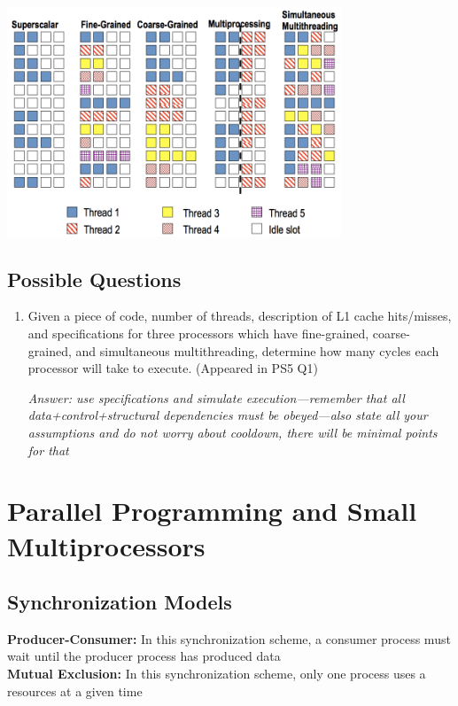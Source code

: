 \documentclass{article}
\begin{document}
\begin{center}
\includegraphics[width=0.75\textwidth]{multithreading}
\end{center}

\subsection{Possible Questions}

\begin{enumerate}
\item Given a piece of code, number of threads, description of L1 cache hits/misses, and specifications for three processors which have fine-grained, coarse-grained, and simultaneous multithreading, determine how many cycles each processor will take to execute. (Appeared in PS5 Q1)

\textit{Answer: use specifications and simulate execution---remember that all data+control+structural dependencies must be obeyed---also state all your assumptions and do not worry about cooldown, there will be minimal points for that}

\end{enumerate}

\section{Parallel Programming and Small Multiprocessors}

\subsection{Synchronization Models}

\textbf{Producer-Consumer:} In this synchronization scheme, a consumer process must wait until the producer process has produced data \\
\textbf{Mutual Exclusion:} In this synchronization scheme, only one process uses a resources at a given time
\end{document}
